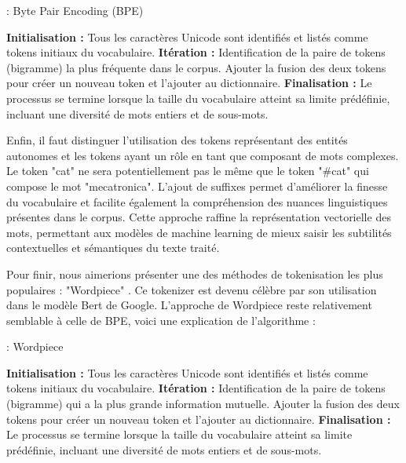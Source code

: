 \documentclass[12pt]{article}
\theoremstyle{definition}
\begin{document}
\begin{algorithm}
	\caption{ : Byte Pair Encoding (BPE)}
	\vspace{0.5em}  %
	\begin{algorithmic}[]
		\State \textbf{Initialisation :} Tous les caractères Unicode sont identifiés et listés comme tokens initiaux du vocabulaire.
		\State \textbf{Itération :} Identification de la paire de tokens (bigramme) la plus fréquente dans le corpus. Ajouter la fusion des deux tokens pour créer un nouveau token et l'ajouter au dictionnaire.
		\State \textbf{Finalisation :} Le processus se termine lorsque la taille du vocabulaire atteint sa limite prédéfinie, incluant une diversité de mots entiers et de sous-mots.
	\end{algorithmic}
\end{algorithm}
	
	Enfin, il faut distinguer l'utilisation des tokens représentant des entités autonomes et les tokens ayant un rôle en tant que composant de mots complexes. Le token "cat" ne sera potentiellement pas le même que le token "\#cat" qui compose le mot "mecatronica". L'ajout de suffixes permet d'améliorer la finesse du vocabulaire et facilite également la compréhension des nuances linguistiques présentes dans le corpus. Cette approche raffine la représentation vectorielle des mots, permettant aux modèles de machine learning de mieux saisir les subtilités contextuelles et sémantiques du texte traité.
	
	Pour finir, nous aimerions présenter une des méthodes de tokenisation les plus populaires : "Wordpiece" \cite{Wordpiece}. Ce tokenizer est devenu célèbre par son utilisation dans le modèle Bert de Google. L'approche de Wordpiece reste relativement semblable à celle de BPE, voici une explication de l'algorithme :  
	
	\begin{algorithm}
		\caption{ : Wordpiece}
		\vspace{0.5em}  %
		\begin{algorithmic}[]
			\State \textbf{Initialisation :} Tous les caractères Unicode sont identifiés et listés comme tokens initiaux du vocabulaire.
			\State \textbf{Itération :} Identification de la paire de tokens (bigramme) qui a la plus grande information mutuelle. Ajouter la fusion des deux tokens pour créer un nouveau token et l'ajouter au dictionnaire.
			\State \textbf{Finalisation :} Le processus se termine lorsque la taille du vocabulaire atteint sa limite prédéfinie, incluant une diversité de mots entiers et de sous-mots.
		\end{algorithmic}
	\end{algorithm}
\end{document}
